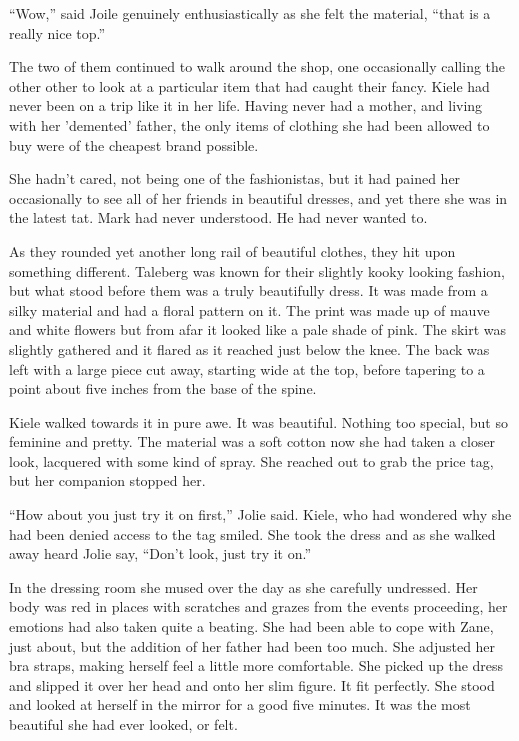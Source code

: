 ``Wow,'' said Joile genuinely enthusiastically as she felt the material, ``that is a really nice top.''

The two of them continued to walk around the shop, one occasionally calling the other other to look at a particular item that had caught their fancy.  Kiele had never been on a trip like it in her life.  Having never had a mother, and living with her 'demented' father, the only items of clothing she had been allowed to buy were of the cheapest brand possible.  

She hadn't cared, not being one of the fashionistas, but it had pained her occasionally to see all of her friends in beautiful dresses, and yet there she was in the latest tat.  Mark had never understood.  He had never wanted to.

As they rounded yet another long rail of beautiful clothes, they hit upon something different.  Taleberg was known for their slightly kooky looking fashion, but what stood before them was a truly beautifully dress.  It was made from a silky material and had a floral pattern on it.  The print was made up of mauve and white flowers but from afar it looked like a pale shade of pink.  The skirt was slightly gathered and it flared as it reached just below the knee.  The back was left with a large piece cut away, starting wide at the top, before tapering to a point about five inches from the base of the spine.  

Kiele walked towards it in pure awe.  It was beautiful.  Nothing too special, but so feminine and pretty.  The material was a soft cotton now she had taken a closer look, lacquered with some kind of spray.  She reached out to grab the price tag, but her companion stopped her.  

``How about you just try it on first,'' Jolie said.  Kiele, who had wondered why she had been denied access to the tag smiled.  She took the dress and as she walked away heard Jolie say, ``Don't look, just try it on.''

In the dressing room she mused over the day as she carefully undressed.  Her body was red in places with scratches and grazes from the events proceeding, her emotions had also taken quite a beating.  She had been able to cope with Zane, just about, but the addition of her father had been too much.  She adjusted her bra straps, making herself feel a little more comfortable.  She picked up the dress and slipped it over her head and onto her slim figure.  It fit perfectly.  She stood and looked at herself in the mirror for a good five minutes.  It was the most beautiful she had ever looked, or felt.

